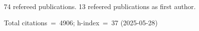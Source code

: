 74 refereed publications. 13 refeered publications as first author.

Total citations~=~4906; h-index~=~37 (2025-05-28)